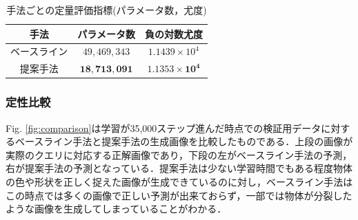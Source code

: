 \begin{table}[tbp]
  \begin{center}
  \caption{手法ごとの定量評価指標(パラメータ数，尤度)}
  \begin{tabular}{|c||c|c|} \hline
    手法 & パラメータ数 & 負の対数尤度 \\ \hline \hline
    ベースライン & $49,469,343$ & $1.1439 \times 10^4$ \\ \hline
    提案手法 & $\bm{18,713,091}$ & $\bm{1.1353 \times 10^4}$ \\ \hline
  \end{tabular}
  \label{table:evaluation}
  \end{center}
\end{table}

\subsubsection{定性比較}
Fig. \ref{fig:comparison}は学習が35,000ステップ進んだ時点での検証用データに対するベースライン手法と提案手法の生成画像を比較したものである．上段の画像が実際のクエリに対応する正解画像であり，下段の左がベースライン手法の予測，右が提案手法の予測となっている．提案手法は少ない学習時間でもある程度物体の色や形状を正しく捉えた画像が生成できているのに対し，ベースライン手法はこの時点では多くの画像で正しい予測が出来ておらず，一部では物体が分裂したような画像を生成してしまっていることがわかる．

